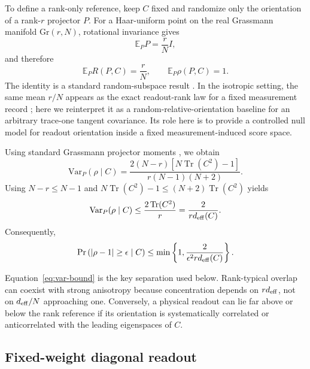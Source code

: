 \documentclass[aps,prx,reprint,superscriptaddress,nofootinbib,longbibliography]{revtex4-2}
\newcommand{\Tr}{\operatorname{Tr}}
\newcommand{\deff}{d_{\rm eff}}
\begin{document}
To define a rank-only reference, keep $C$ fixed and randomize only the orientation of a rank-$r$ projector $P$. For a Haar-uniform point on the real Grassmann manifold $\mathrm{Gr}(r,N)$, rotational invariance gives
\begin{equation}
\mathbb{E}_P P=\frac{r}{N}I,
\end{equation}
and therefore
\begin{equation}
\mathbb{E}_P R(P,C)=\frac{r}{N},
\qquad
\mathbb{E}_P\rho(P,C)=1.
\label{eq:rank-baseline}
\end{equation}
The identity is a standard random-subspace result \cite{CollinsMatsumoto2017,Bendokat2024,Fernandez2025}. In the isotropic setting, the same mean $r/N$ appears as the exact readout-rank law for a fixed measurement record \cite{AitHaddou2026IsotropicRankLaws}; here we reinterpret it as a random-relative-orientation baseline for an arbitrary trace-one tangent covariance. Its role here is to provide a controlled null model for readout orientation inside a fixed measurement-induced score space.

Using standard Grassmann projector moments \cite{CollinsMatsumoto2017}, we obtain
\begin{equation}
\mathrm{Var}_P(\rho\mid C)
=\frac{2(N-r)\left[N\Tr(C^2)-1\right]}
{r(N-1)(N+2)}.
\label{eq:exact-var}
\end{equation}
Using $N-r\le N-1$ and $N\Tr(C^2)-1\le(N+2)\Tr(C^2)$ yields
\begin{equation}
\mathrm{Var}_P(\rho\mid C)
\le \frac{2\Tr(C^2)}{r}
=\frac{2}{r\deff(C)}.
\label{eq:var-bound}
\end{equation}
Consequently,
\begin{equation}
\Pr\left(|\rho-1|\ge\epsilon\mid C\right)
\le
\min\left\{1,\frac{2}{\epsilon^2r\deff(C)}\right\}.
\label{eq:cheb}
\end{equation}

Equation~\eqref{eq:var-bound} is the key separation used below. Rank-typical overlap can coexist with strong anisotropy because concentration depends on $r\deff$, not on $\deff/N$ approaching one. Conversely, a physical readout can lie far above or below the rank reference if its orientation is systematically correlated or anticorrelated with the leading eigenspaces of $C$.

\subsection{Fixed-weight diagonal readout}
\end{document}
